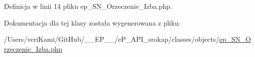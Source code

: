 Definicja w linii 14 pliku ep\-\_\-\-S\-N\-\_\-\-Orzeczenie\-\_\-\-Izba.\-php.



Dokumentacja dla tej klasy została wygenerowana z pliku\-:\begin{DoxyCompactItemize}
\item 
/\-Users/veri\-Kami/\-Git\-Hub/\-\_\-\-\_\-\-E\-P\-\_\-\-\_\-/e\-P\-\_\-\-A\-P\-I\-\_\-srokap/classes/objects/\hyperlink{ep___s_n___orzeczenie___izba_8php}{ep\-\_\-\-S\-N\-\_\-\-Orzeczenie\-\_\-\-Izba.\-php}\end{DoxyCompactItemize}
